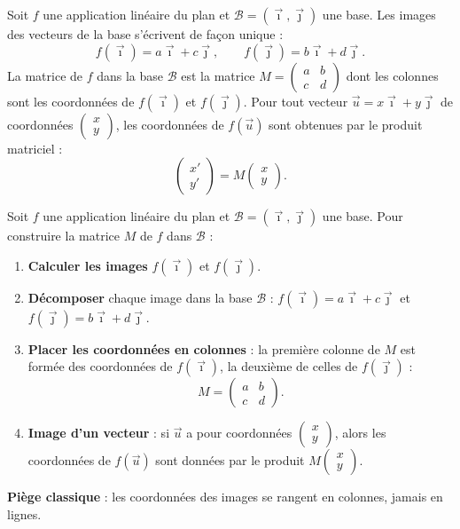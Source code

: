 \documentclass[11pt]{article}
\newcommand{\cle}[1]{{\popxbold\color{popdark}#1}}
\begin{document}
\begin{propriete}
Soit $f$ une application linéaire du plan et $\mathcal{B}=(\vec{\imath},\vec{\jmath})$ une base. Les images des vecteurs de la base s'écrivent de façon unique :
\[ f(\vec{\imath})=a\vec{\imath}+c\vec{\jmath}, \qquad f(\vec{\jmath})=b\vec{\imath}+d\vec{\jmath}. \]
La \cle{matrice de $f$ dans la base $\mathcal{B}$} est la matrice $M=\begin{pmatrix} a & b \\ c & d \end{pmatrix}$ dont les \cle{colonnes} sont les coordonnées de $f(\vec{\imath})$ et $f(\vec{\jmath})$.
Pour tout vecteur $\vec{u}=x\vec{\imath}+y\vec{\jmath}$ de coordonnées $\begin{pmatrix} x \\ y \end{pmatrix}$, les coordonnées de $f(\vec{u})$ sont obtenues par le produit matriciel :
\[ \begin{pmatrix} x' \\ y' \end{pmatrix}=M\begin{pmatrix} x \\ y \end{pmatrix}. \]
\end{propriete}

\begin{methode}
Soit $f$ une application linéaire du plan et $\mathcal{B}=(\vec{\imath},\vec{\jmath})$ une base. Pour construire la matrice $M$ de $f$ dans $\mathcal{B}$ :
\begin{enumerate}
\item \textbf{Calculer les images} $f(\vec{\imath})$ et $f(\vec{\jmath})$.
\item \textbf{Décomposer} chaque image dans la base $\mathcal{B}$ : $f(\vec{\imath})=a\vec{\imath}+c\vec{\jmath}$ et $f(\vec{\jmath})=b\vec{\imath}+d\vec{\jmath}$.
\item \textbf{Placer les coordonnées en colonnes} : la première colonne de $M$ est formée des coordonnées de $f(\vec{\imath})$, la deuxième de celles de $f(\vec{\jmath})$ :
\[ M=\begin{pmatrix} a & b \\ c & d \end{pmatrix}. \]
\item \textbf{Image d'un vecteur} : si $\vec{u}$ a pour coordonnées $\begin{pmatrix} x \\ y \end{pmatrix}$, alors les coordonnées de $f(\vec{u})$ sont données par le produit $M\begin{pmatrix} x \\ y \end{pmatrix}$.
\end{enumerate}
\textbf{Piège classique} : les coordonnées des images se rangent en \cle{colonnes}, jamais en lignes.
\end{methode}
\end{document}

